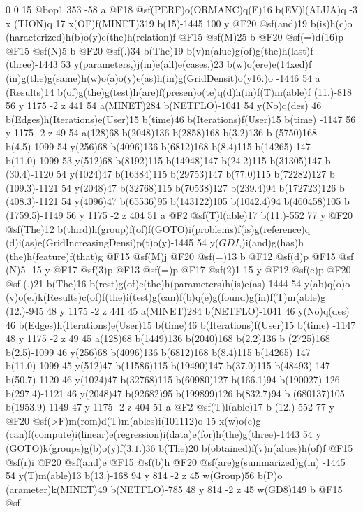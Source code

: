 {{{{{{{{{{{{{{{{{{{{{{{{{{{{{{{{{{{{{{{{{{{{{{{{{{{{{{{{{{{{{{{{{{{{{{{{{{{{{{{{{{{{{{{{{{{0 0 15 @bop1 353 -58 a @F18 @sf(PERF)o(ORMANC)q(E)16 b(EV)l(ALUA)q -3 x
(TION)q 17 x(OF)f(MINET)319 b(15)-1445 100 y @F20 @sf(and)19 b(is)h(c)o
(haracterized)h(b)o(y)e(the)h(relation)f @F15 @sf(M)25 b @F20 @sf(=)d(16)p 
@F15 @sf(N)5 b @F20 @sf(.)34 b(The)19 b(v)n(alue)g(of)g(the)h(last)f
(three)-1443 53 y(parameters,)j(in)e(all)e(cases,)23 b(w)o(ere)e(\014xed)f
(in)g(the)g(same)h(w)o(a)o(y)e(as)h(in)g(Grid{Densit)o(y{16.)o -1446 54 a
(Results)14 b(of)g(the)g(test)h(are)f(presen)o(te)q(d)h(in)f(T)m(able)f
(11.)-818 56 y 1175 -2 z 441 54 a(MINET)284 b(NETFLO)-1041 54 y(No)q(des)
46 b(Edges)h(Iterations)e(User)15 b(time)46 b(Iterations)f(User)15 b(time)
-1147 56 y 1175 -2 z 49 54 a(128)68 b(2048)136 b(2858)168 b(3.2)136 b
(5750)168 b(4.5)-1099 54 y(256)68 b(4096)136 b(6812)168 b(8.4)115 b(14265)
147 b(11.0)-1099 53 y(512)68 b(8192)115 b(14948)147 b(24.2)115 b(31305)147 b
(30.4)-1120 54 y(1024)47 b(16384)115 b(29753)147 b(77.0)115 b(72282)127 b
(109.3)-1121 54 y(2048)47 b(32768)115 b(70538)127 b(239.4)94 b(172723)126 b
(408.3)-1121 54 y(4096)47 b(65536)95 b(143122)105 b(1042.4)94 b(460458)105 b
(1759.5)-1149 56 y 1175 -2 z 404 51 a @F2 @sf(T)l(able)17 b(11.)-552 77 y 
@F20 @sf(The)12 b(third)h(group)f(of)f(GOTO)i(problems)f(is)g(reference)q
(d)i(as)e(Grid{Increasing{Densi)p(t)o(y)-1445 54 y(\(GDI\),)i(and)g(has)h
(the)h(feature)f(that)g @F15 @sf(M)j @F20 @sf(=)13 b @F12 @sf(d)p @F15 @sf
(N)5 -15 y @F17 @sf(3)p @F13 @sf(=)p @F17 @sf(2)1 15 y @F12 @sf(e)p @F20 @sf
(.)21 b(The)16 b(rest)g(of)e(the)h(parameters)h(is)e(as)-1444 54 y(ab)q(o)o
(v)o(e.)k(Results)c(of)f(the)i(test)g(can)f(b)q(e)g(found)g(in)f(T)m(able)g
(12.)-945 48 y 1175 -2 z 441 45 a(MINET)284 b(NETFLO)-1041 46 y(No)q(des)
46 b(Edges)h(Iterations)e(User)15 b(time)46 b(Iterations)f(User)15 b(time)
-1147 48 y 1175 -2 z 49 45 a(128)68 b(1449)136 b(2040)168 b(2.2)136 b
(2725)168 b(2.5)-1099 46 y(256)68 b(4096)136 b(6812)168 b(8.4)115 b(14265)
147 b(11.0)-1099 45 y(512)47 b(11586)115 b(19490)147 b(37.0)115 b(48493)
147 b(50.7)-1120 46 y(1024)47 b(32768)115 b(60980)127 b(166.1)94 b(190027)
126 b(297.4)-1121 46 y(2048)47 b(92682)95 b(199899)126 b(832.7)94 b
(680137)105 b(1953.9)-1149 47 y 1175 -2 z 404 51 a @F2 @sf(T)l(able)17 b
(12.)-552 77 y @F20 @sf(>F)m(rom)d(T)m(ables)i(10{11{12)o 15 x(w)o(e)g
(can)f(compute)i(linear)e(regression)i(data)e(for)h(the)g(three)-1443 54 y
(GOTO)k(groups)g(b)o(y)f(\(3.1\).)36 b(The)20 b(obtained)f(v)n(alues)h(of)f 
@F15 @sf(r)i @F20 @sf(and)e @F15 @sf(b)h @F20 @sf(are)g(summarized)g(in)
-1445 54 y(T)m(able)13 b(13.)-168 94 y 814 -2 z 45 w(Group)56 b(P)o
(arameter)k(MINET)49 b(NETFLO)-785 48 y 814 -2 z 45 w(GD{8)149 b @F15 @sf
}}}}}}}}}}}}}}}}}}}}}}}}}}}}}}}}}}}}}}}}}}}}}}}}}}}}}}}}}}}}}}}}}}}}}}}}}}}}}}}}}}}}}}}}}}}}}}}}}}
